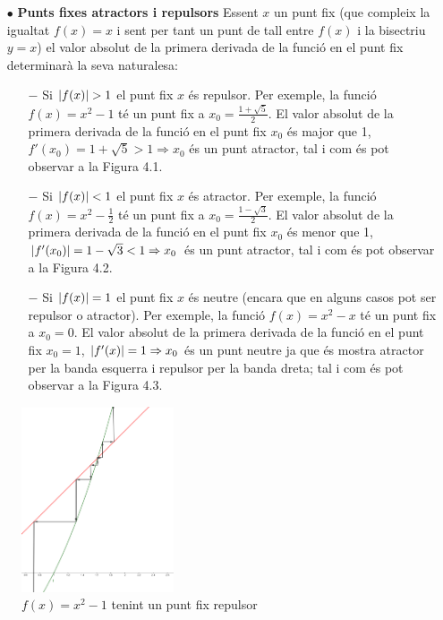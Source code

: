 \documentclass[12pt]{report}
\begin{document}
\begin{itemize}
        \item [$\bullet$] \textbf{Punts fixes atractors i repulsors}
        \newline
Essent $x$ un punt fix (que compleix la igualtat $f(x)=x$ i sent per tant un punt de tall entre $f(x)$ i la bisectriu $y=x$) el valor absolut de la primera derivada de la funció en el punt fix determinarà la seva naturalesa:
\begin{itemize}
    \item [$-$] Si $\arrowvert f(x) \arrowvert >1$ el punt fix $x$ és repulsor. Per exemple, la funció $f(x)=x^2-1$ té un punt fix a $x_0=\frac{1+\sqrt{5}}{2}$. El valor absolut de la primera derivada de la funció en el punt fix $x_0$ és major que 1, $f'(x_0)=1+\sqrt{5}>1 \Rightarrow x_0$ és un punt atractor, tal i com és pot observar a la Figura 4.1.
    \item [$-$] Si $\arrowvert f(x) \arrowvert <1$ el punt fix $x$ és atractor. Per exemple, la funció $f(x) = x^2-\frac{1}{2}$ té un punt fix a $x_0= \frac{1-\sqrt{3}}{2}$. El valor absolut de la primera derivada de la funció en el punt fix $x_0$ és menor que 1, $\arrowvert f'(x_0)\arrowvert= 1-\sqrt{3}<1 \Rightarrow x_0$ és un punt atractor, tal i com és pot observar a la Figura 4.2.
    \item [$-$] Si $\arrowvert f(x) \arrowvert =1$ el punt fix $x$ és neutre (encara que en alguns casos pot ser repulsor o atractor). Per exemple, la funció $f(x)=x^2-x$ té un punt fix a $x_0= 0$. El valor absolut de la primera derivada de la funció en el punt fix $x_0= 1$, $\arrowvert f'(x) \arrowvert=1 \Rightarrow x_0$ és un punt neutre ja que és mostra atractor per la banda esquerra i repulsor per la banda dreta; tal i com és pot observar a la Figura 4.3.
\end{itemize}
\end{itemize}
\begin{figure}
        \centering
        \includegraphics[width=0.4\textwidth]{f(x)repulsor.PNG}
        \caption{$f(x)=x^2-1$ tenint un punt fix repulsor}
        \label{fig:my_label}
\end{figure}
\end{document}
